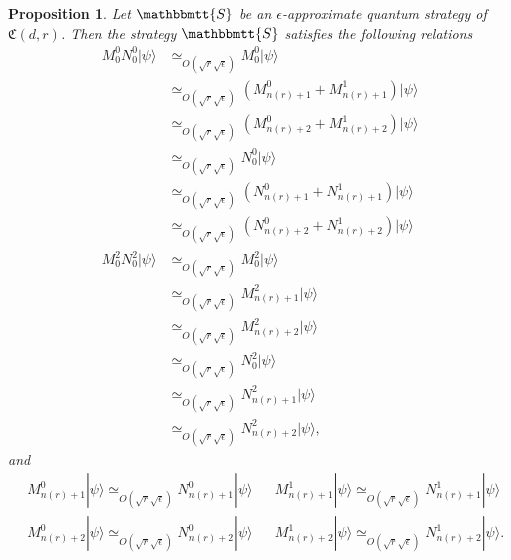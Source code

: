 \documentclass[11pt,letterpaper]{article}
\newcommand{\ket}[1]{|#1\rangle}
\newcommand{\1}{\mathbb{1}}
\newcommand{\nr}{n(r)}
\newcommand{\fC}{\mathfrak{C}}
\newcommand{\bS}{\mathbbmtt{S}}
\newcommand{\ep}{\epsilon}
\newcommand{\se}{\sqrt{\epsilon}}
\newcommand{\sr}{\sqrt{r}}
\newcommand{\appd}[1]{\simeq_{#1}}
\newtheorem{proposition}[theorem]{Proposition}
\theoremstyle{definition}
\begin{document}
\begin{proposition}
\label{prop:chsh_base}
Let $\bS$ be an $\ep$-approximate quantum strategy of $\fC(d,r)$.
Then the strategy $\bS$ satisfies the following relations
\begin{align*}
	  M_0^0 N_0^0 \ket{\psi}
	  &\appd{O( \sr \se)}M_0^0 \ket{\psi}\\
	  &\appd{O( \sr \se)} (M_{\nr+1}^0+M_{\nr+1}^1)\ket{\psi}\\
	  &\appd{O( \sr \se)} (M_{\nr+2}^0+M_{\nr+2}^1)\ket{\psi} \\
	  &\appd{O( \sr \se)} N_0^0 \ket{\psi}\\
	  &\appd{O( \sr \se)} (N_{\nr+1}^0+N_{\nr+1}^1)\ket{\psi}\\
	  &\appd{O( \sr \se)} (N_{\nr+2}^0+N_{\nr+2}^1)\ket{\psi}\\
	M_0^2 N_0^2\ket{\psi}&\appd{O( \sr \se)} M_0^2 \ket{\psi}\\
	&\appd{O( \sr \se)} M_{\nr+1}^2 \ket{\psi}\\
	&\appd{O( \sr \se)} M_{\nr+2}^2 \ket{\psi}\\
	&\appd{O( \sr \se)} N_0^2 \ket{\psi}\\
	&\appd{O( \sr \se)} N_{\nr+1}^2 \ket{\psi}\\
	&\appd{O( \sr \se)} N_{\nr+2}^2 \ket{\psi},
\end{align*}
and
\begin{align*}
&M_{\nr+1}^0 \ket{\psi} \appd{O( \sr \se)} N_{\nr+1}^0 \ket{\psi} && M_{\nr+1}^1\ket{\psi} \appd{O( \sr \se)} N_{\nr+1}^1 \ket{\psi}\\
&M_{\nr+2}^0 \ket{\psi} \appd{O( \sr \se)} N_{\nr+2}^0 \ket{\psi} && M_{\nr+2}^1\ket{\psi} \appd{O( \sr \se)} N_{\nr+2}^1 \ket{\psi}.
\end{align*}
\end{proposition}
\end{document}
